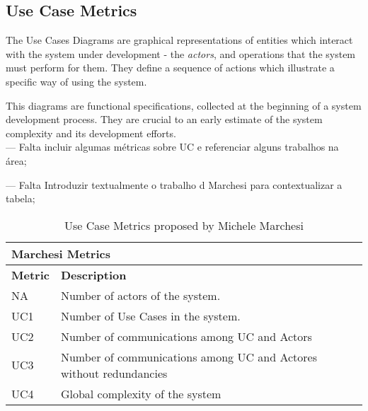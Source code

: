 \subsection{Use Case Metrics}



The Use Cases Diagrams are graphical representations of entities which interact with the system under development - the \emph{actors}, and operations that the system must perform for them.
They define a sequence of actions which illustrate a specific way of using the system.

This diagrams are functional specifications, collected at the beginning of a system development process.
They are crucial to an early estimate of the system complexity and its development efforts.\\
  
 
 --- Falta incluir algumas métricas sobre UC e referenciar alguns trabalhos na área;
 
 --- Falta Introduzir textualmente o trabalho d Marchesi para contextualizar a tabela;
 
\begin{center}
\begin{table}[h]
\begin{tabular}{ p{} | p{10.5cm}}
\multicolumn{2}{l}{\textbf{Marchesi Metrics}} \\ \hline
\textbf{Metric} & \textbf{Description} \\ \hline
NA & Number of actors of the system. \\ \hline
UC1 & Number of Use Cases in the system. \\ \hline 
UC2 & Number of communications among UC and Actors  \\ \hline 
UC3 & Number of communications among UC and Actores without redundancies \\ \hline 
UC4 & Global complexity of the system \\ \hline 
\end{tabular}
\caption{\small{Use Case Metrics proposed by Michele Marchesi}}
\label{t:ucm}
\end{table}
\end{center}
